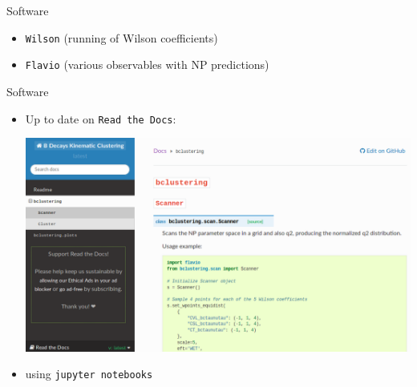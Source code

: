 \begin{frame}{Software}
\begin{itemize}
        \item {} \texttt{Wilson} {\footnotesize(running of Wilson coefficients)}
        \item {} \texttt{Flavio} {\footnotesize(various observables with NP predictions)}
    \end{itemize}
\end{frame}

\begin{frame}{Software}
    \begin{itemize}
        \item Up to date  on  \texttt{Read the Docs}:\\[3ex]
        \begin{center}\includegraphics[width=0.8\linewidth]{figures/scrot/readthedocs.png}\end{center}
        \vspace{2ex}
        \item {} using  \texttt{jupyter notebooks}
    \end{itemize}
    
    \bigskip
    
\end{frame}

